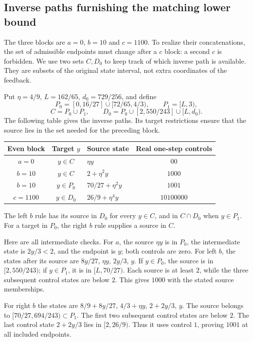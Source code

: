 \documentclass[11pt,reqno]{amsart}
\numberwithin{equation}{section}
\theoremstyle{definition}
\theoremstyle{definition}
\begin{document}
\subsection*{Inverse paths furnishing the matching lower bound}
The three blocks are $a=0$, $b=10$ and $c=1100$. To realize their
concatenations, the set of admissible endpoints must change after a
$c$ block: a second $c$ is forbidden. We use two sets $C,D_0$ to
keep track of which inverse path is available. They are subsets of
the original state interval, not extra coordinates of the feedback.

Put $\eta=4/9$, $L=162/65$, $d_0=729/256$, and define
\[
 P_0=[0,16/27]\cup[72/65,4/3),\qquad P_1=[L,3),
\]
\[
 C=P_0\cup P_1,\qquad
 D_0=P_0\cup[2,550/243]\cup[L,d_0).
\]
The following table gives the inverse paths. Its target restrictions
ensure that the source lies in the set needed for the preceding block.
\begin{center}
\begin{tabular}{cclc}
\toprule
Even block&Target $y$&Source state&Real one-step controls\\
\midrule
$a=0$&$y\in C$&$\eta y$&$00$\\
$b=10$&$y\in C$&$2+\eta^2y$&$1000$\\
$b=10$&$y\in P_0$&$70/27+\eta^2y$&$1001$\\
$c=1100$&$y\in D_0$&$26/9+\eta^4y$&$10100000$\\
\bottomrule
\end{tabular}
\end{center}
The left $b$ rule has its source in $D_0$ for every $y\in C$,
and in $C\cap D_0$ when $y\in P_1$. For a target in $P_0$,
the right $b$ rule supplies a source in $C$.

Here are all intermediate checks. For $a$, the source
$\eta y$ is in $P_0$, the intermediate state is $2y/3<2$,
and the endpoint is $y$; both controls are zero.
For left $b$, the states after its source are
$8y/27$, $\eta y$, $2y/3$, $y$. If $y\in P_0$, the
source is in $[2,550/243)$; if $y\in P_1$, it is in
$[L,70/27)$. Each source is at least $2$, while the three subsequent control states are
below $2$. This gives $1000$ with the stated source memberships.

For right $b$ the states are
$8/9+8y/27$, $4/3+\eta y$, $2+2y/3$, $y$.
The source belongs to $[70/27,694/243)\subset P_1$.
The first two subsequent control states are below $2$.
The last control state $2+2y/3$ lies in $[2,26/9)$.
Thus it uses control $1$, proving $1001$ at all included endpoints.
\end{document}
